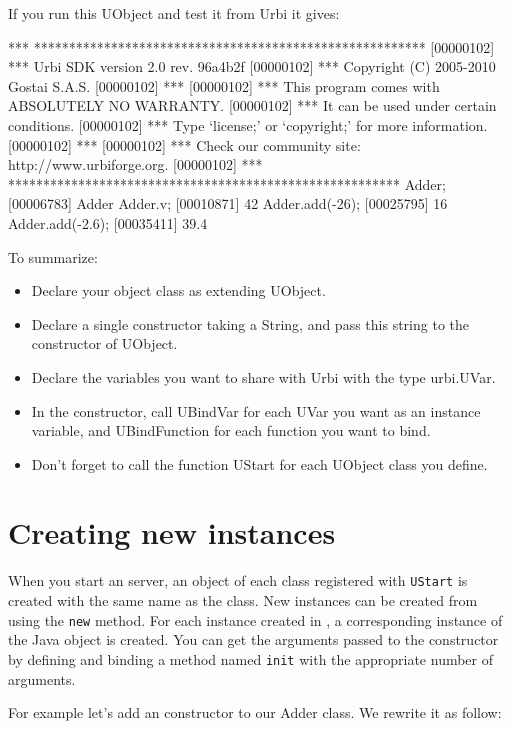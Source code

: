 If you run this UObject and test it from Urbi it gives:

\begin{cxx}
[00000102] *** ********************************************************
[00000102] *** Urbi SDK version 2.0 rev. 96a4b2f
[00000102] *** Copyright (C) 2005-2010 Gostai S.A.S.
[00000102] ***
[00000102] *** This program comes with ABSOLUTELY NO WARRANTY.
[00000102] *** It can be used under certain conditions.
[00000102] *** Type `license;' or `copyright;' for more information.
[00000102] ***
[00000102] *** Check our community site: http://www.urbiforge.org.
[00000102] *** ********************************************************
Adder;
[00006783] Adder
Adder.v;
[00010871] 42
Adder.add(-26);
[00025795] 16
Adder.add(-2.6);
[00035411] 39.4
\end{cxx}

To summarize:

\begin{itemize}
\item Declare your object class as extending UObject.
\item Declare a single constructor taking a String, and pass this string to
  the constructor of UObject.
\item Declare the variables you want to share with Urbi with the type
  urbi.UVar.
\item In the constructor, call UBindVar for each UVar you want as an
  instance variable, and UBindFunction for each function you want to bind.
\item Don't forget to call the function UStart for each UObject class you define.
\end{itemize}

\section{Creating new instances}
\label{sec:uob:apijava:new}

When you start an \urbi server, an object of each class registered with
\lstinline{UStart} is created with the same name as the class. New instances
can be created from \urbi using the \lstinline|new| method. For each
instance created in \urbi, a corresponding instance of the Java object is
created. You can get the arguments passed to the constructor by defining and
binding a method named \lstinline|init| with the appropriate number of
arguments.

For example let's add an \urbi constructor to our Adder class. We rewrite
it as follow:

